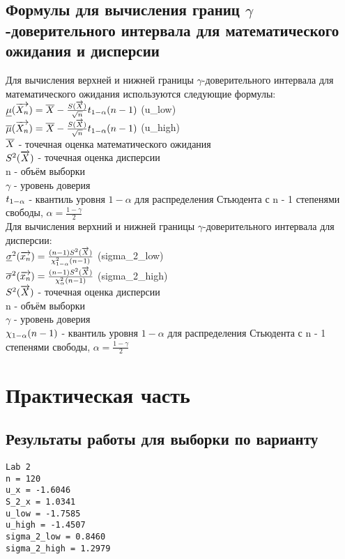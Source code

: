 \section{Формулы для вычисления границ $\gamma$-доверительного интервала для математического ожидания и дисперсии}
Для вычисления верхней и нижней границы $\gamma$-доверительного интервала для математического ожидания используются следующие формулы:\\
$\underline{\mu}(\overrightarrow{X_{n}}) = \overline{X} - \frac{S(\overrightarrow{X})}{\sqrt{n}}t_{1 - \alpha}(n - 1)$ (u\_low)\\
$\overline{\mu}(\overrightarrow{X_{n}}) = \overline{X} - \frac{S(\overrightarrow{X})}{\sqrt{n}}t_{1 - \alpha}(n - 1)$ (u\_high)\\
$\overline{X}$ - точечная оценка математического ожидания\\
$S^{2}(\overrightarrow{X})$ - точечная оценка дисперсии\\
n - объём выборки\\
$\gamma$ - уровень доверия\\
$t_{1 - \alpha}$ - квантиль уровня $1 - \alpha$ для распределения Стьюдента с n - 1 степенями свободы, $\alpha = \frac{1 - \gamma}{2}$\\

Для вычисления верхний и нижней границы $\gamma$-доверительного интервала для дисперсии:\\
$\underline{\sigma}^{2}(\overrightarrow{x_{n}}) = \frac{(n - 1)S^{2}(\overrightarrow{X})}{\chi^{2}_{1 - \alpha}(n - 1)}$  (sigma\_2\_low)\\
$\overline{\sigma}^{2}(\overrightarrow{x_{n}}) = \frac{(n - 1)S^{2}(\overrightarrow{X})}{\chi^{2}_{\alpha}(n - 1)}$ (sigma\_2\_high)\\
$S^{2}(\overrightarrow{X})$ - точечная оценка дисперсии\\
n - объём выборки\\
$\gamma$ - уровень доверия\\
$\chi_{1 - \alpha}(n - 1)$ - квантиль уровня $1 - \alpha$ для распределения Стьюдента с n - 1 степенями свободы, $\alpha = \frac{1 - \gamma}{2}$\\

\chapter{Практическая часть}

\section{Результаты работы для выборки по варианту}
\begin{lstlisting}
Lab 2
n = 120
u_x = -1.6046
S_2_x = 1.0341
u_low = -1.7585
u_high = -1.4507
sigma_2_low = 0.8460
sigma_2_high = 1.2979
\end{lstlisting}
\newpage

